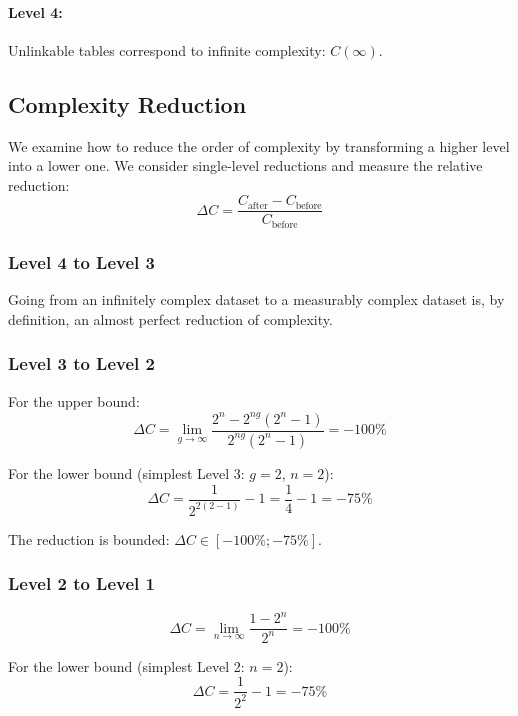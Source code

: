 \documentclass[Afour,times,sageh]{sagej}
\begin{document}
\paragraph{Level 4:}
Unlinkable tables correspond to infinite complexity: $C(\infty)$.

\subsection{Complexity Reduction}

We examine how to reduce the order of complexity by transforming a higher level into a lower one. We consider single-level reductions and measure the relative reduction:
\begin{equation}
\Delta C = \frac{C_{\text{after}} - C_{\text{before}}}{C_{\text{before}}}
\end{equation}

\subsubsection{Level 4 to Level 3}
Going from an infinitely complex dataset to a measurably complex dataset is, by definition, an almost perfect reduction of complexity.

\subsubsection{Level 3 to Level 2}
For the upper bound:
\begin{equation}
\Delta C = \lim_{g \to \infty} \frac{2^n - 2^{ng}(2^n - 1)}{2^{ng}(2^n - 1)} = -100\%
\end{equation}

For the lower bound (simplest Level 3: $g=2$, $n=2$):
\begin{equation}
\Delta C = \frac{1}{2^{2(2-1)}} - 1 = \frac{1}{4} - 1 = -75\%
\end{equation}

The reduction is bounded: $\Delta C \in [-100\%; -75\%]$.

\subsubsection{Level 2 to Level 1}
\begin{equation}
\Delta C = \lim_{n \to \infty} \frac{1 - 2^n}{2^n} = -100\%
\end{equation}

For the lower bound (simplest Level 2: $n=2$):
\begin{equation}
\Delta C = \frac{1}{2^2} - 1 = -75\%
\end{equation}
\end{document}
